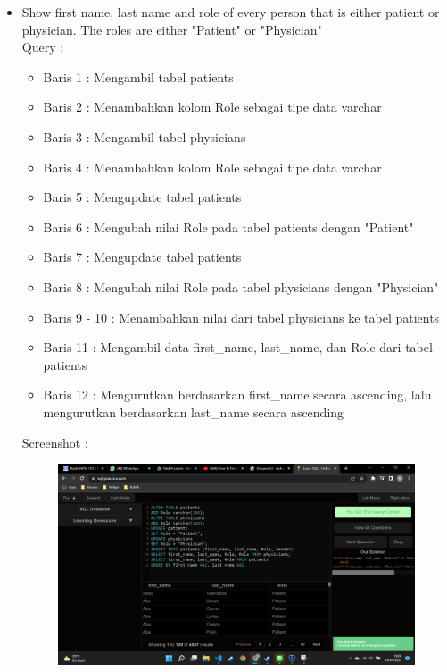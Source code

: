 \documentclass[]{article}
\begin{document}
\begin{itemize}
        \item Show first name, last name and role of every person that is either patient or physician. The roles are either "Patient" or "Physician"
        \\Query :
        
        \begin{itemize}
            \item Baris 1 : Mengambil tabel patients
            \item Baris 2 : Menambahkan kolom Role sebagai tipe data varchar
            \item Baris 3 : Mengambil tabel physicians
            \item Baris 4 : Menambahkan kolom Role sebagai tipe data varchar
            \item Baris 5 : Mengupdate tabel patients
            \item Baris 6 : Mengubah nilai Role pada tabel patients dengan "Patient"
            \item Baris 7 : Mengupdate tabel patients
            \item Baris 8 : Mengubah nilai Role pada tabel physicians dengan "Physician"
            \item Baris 9 - 10 : Menambahkan nilai dari tabel physicians ke tabel patients
            \item Baris 11 : Mengambil data first\_name, last\_name, dan Role dari tabel patients
            \item Baris 12 : Mengurutkan berdasarkan first\_name secara ascending, lalu mengurutkan berdasarkan last\_name secara ascending
        \end{itemize}
        Screenshot :
        \begin{figure}[h]
            \includegraphics[scale=0.3]{./Screenshot/Medium-10.png}
            \centering
        \end{figure}


\end{itemize}
\end{document}
